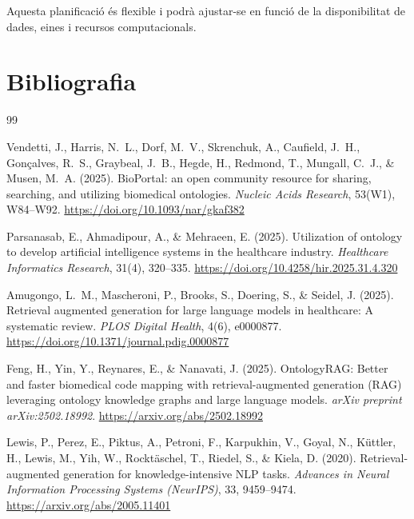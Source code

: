 \documentclass[11pt,a4paper]{article}
\begin{document}
Aquesta planificació és flexible i podrà ajustar-se en funció de la disponibilitat de dades, eines i recursos computacionals.



\section*{Bibliografia}
\begin{thebibliography}{99}

Vendetti, J., Harris, N.~L., Dorf, M.~V., Skrenchuk, A., Caufield, J.~H., Gon\c{c}alves, R.~S., Graybeal, J.~B., Hegde, H., Redmond, T., Mungall, C.~J., \& Musen, M.~A. (2025).
\newblock BioPortal: an open community resource for sharing, searching, and utilizing biomedical ontologies.
\newblock \textit{Nucleic Acids Research}, 53(W1), W84--W92.
\newblock \url{https://doi.org/10.1093/nar/gkaf382}

Parsanasab, E., Ahmadipour, A., \& Mehraeen, E. (2025).
\newblock Utilization of ontology to develop artificial intelligence systems in the healthcare industry.
\newblock \textit{Healthcare Informatics Research}, 31(4), 320--335.
\newblock \url{https://doi.org/10.4258/hir.2025.31.4.320}

Amugongo, L.~M., Mascheroni, P., Brooks, S., Doering, S., \& Seidel, J. (2025).
\newblock Retrieval augmented generation for large language models in healthcare: A systematic review.
\newblock \textit{PLOS Digital Health}, 4(6), e0000877.
\newblock \url{https://doi.org/10.1371/journal.pdig.0000877}

Feng, H., Yin, Y., Reynares, E., \& Nanavati, J. (2025).
\newblock OntologyRAG: Better and faster biomedical code mapping with retrieval-augmented generation (RAG) leveraging ontology knowledge graphs and large language models.
\newblock \textit{arXiv preprint arXiv:2502.18992}.
\newblock \url{https://arxiv.org/abs/2502.18992}

Lewis, P., Perez, E., Piktus, A., Petroni, F., Karpukhin, V., Goyal, N., K\"{u}ttler, H., Lewis, M., Yih, W., Rockt\"{a}schel, T., Riedel, S., \& Kiela, D. (2020).
\newblock Retrieval-augmented generation for knowledge-intensive NLP tasks.
\newblock \textit{Advances in Neural Information Processing Systems
(NeurIPS)}, 33, 9459--9474.
\newblock \url{https://arxiv.org/abs/2005.11401}


\end{thebibliography}
\end{document}
